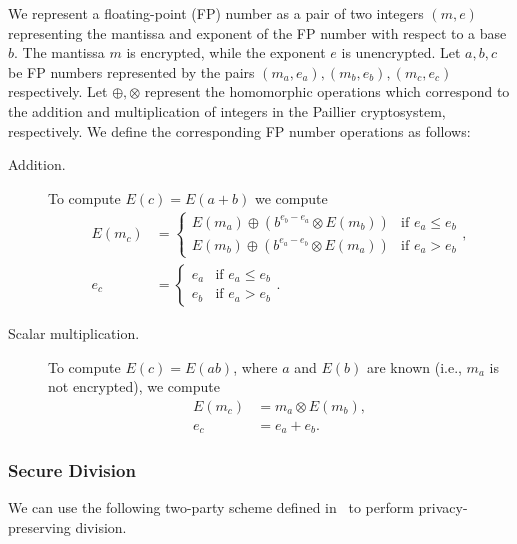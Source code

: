 We represent a floating-point (FP) number as a pair of two integers $(m,e)$ representing the mantissa and exponent of the FP number with respect to a base $b$. The mantissa $m$ is encrypted, while the exponent $e$ is unencrypted.
Let $a,b,c$ be FP numbers represented by the pairs $(m_a,e_a),(m_b,e_b),(m_c,e_c)$ respectively. Let $\oplus,\otimes$ represent the homomorphic operations which correspond to the addition and multiplication of integers in the Paillier cryptosystem, respectively. We define the corresponding FP number operations as follows:
\begin{description}
  \item[Addition.]
    To compute $E\left(c\right)=E\left(a+b\right)$ we compute
	\begin{align*}
		E\left(m_c\right) &= 
		\begin{cases}
			E\left(m_a\right) \oplus \left(b^{e_b-e_a} \otimes E\left(m_b\right)\right) & \text{if } e_a \leq e_b \\
			E\left(m_b\right) \oplus \left(b^{e_a-e_b} \otimes E\left(m_a\right)\right) & \text{if } e_a > e_b
		\end{cases}, \\
		e_c &= %
		\begin{cases}
			e_a & \text{if } e_a \leq e_b \\
			e_b & \text{if } e_a > e_b
		\end{cases}.
	\end{align*}
  \item[Scalar multiplication.]
    To compute $E\left(c\right) = E\left(ab\right)$, where $a$ and $E\left(b\right)$ are known (i.e., $m_a$ is not encrypted), we compute
    \begin{align*}
      E\left(m_c\right) &= m_a \otimes E\left(m_b\right),\\
      e_c &= e_a + e_b.
    \end{align*}
\end{description}

\subsubsection{Secure Division}
We can use the following two-party scheme defined in~\cite{boukoros_lightweight_2017} to perform privacy-preserving division.

